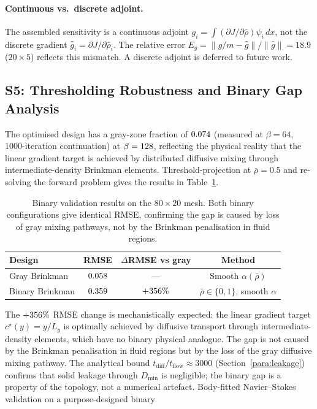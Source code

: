 \paragraph{Continuous vs.\ discrete adjoint.}
The assembled sensitivity is a continuous adjoint
$g_i=\int(\partial J/\partial\bar\rho)\psi_i\,dx$,
not the discrete gradient $\hat{g}_i=\partial J/\partial\bar\rho_i$.
The relative error $E_g = \|g/m - \hat{g}\|/\|\hat{g}\| = 18.9$
($20\times5$) reflects this mismatch. A discrete adjoint is deferred
to future work.

\subsection*{S5: Thresholding Robustness and Binary Gap Analysis}
\label{sec:s5}

The optimised design has a gray-zone fraction of $0.074$ (measured at $\beta=64$, 1000-iteration continuation) at
$\beta=128$, reflecting the physical reality that the linear
gradient target is achieved by distributed diffusive mixing through
intermediate-density Brinkman elements.
Threshold-projection at $\bar\rho=0.5$ and re-solving the forward problem
gives the results in Table~\ref{tab:binary_val}.

\begin{table}[h]
\centering
\caption{Binary validation results on the $80\times20$ mesh.
         Both binary configurations give identical RMSE, confirming
         the gap is caused by loss of gray mixing pathways, not
         by the Brinkman penalisation in fluid regions.}
\label{tab:binary_val}
\begin{tabular}{@{}lccc@{}}
\toprule
\textbf{Design} & \textbf{RMSE} & \textbf{$\Delta$RMSE vs gray} & \textbf{Method} \\
\midrule
Gray Brinkman   & $0.058$         & ---              & Smooth $\alpha(\bar\rho)$ \\
Binary Brinkman & $0.359$ & $+356\%$ & $\bar\rho\in\{0,1\}$, smooth $\alpha$ \\
\bottomrule
\end{tabular}
\end{table}

\noindent
The $+356\%$ RMSE change is mechanistically expected:
the linear gradient target $c^\star(y)=y/L_y$ is optimally achieved
by diffusive transport through intermediate-density elements, which
have no binary physical analogue.
The gap is not caused by the Brinkman penalisation in fluid
regions but by the loss of the gray diffusive mixing pathway.
The analytical bound $t_{\mathrm{diff}}/t_{\mathrm{flow}} \approx 3000$
(Section~\ref{para:leakage}) confirms that solid leakage through
$D_{\min}$ is negligible; the binary gap is a property of the
topology, not a numerical artefact.
Body-fitted Navier--Stokes validation on a purpose-designed binary